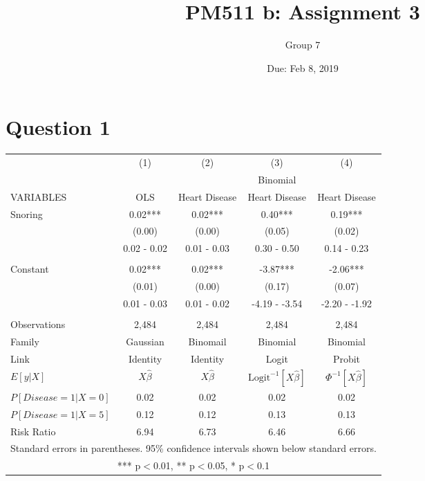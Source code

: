 \documentclass{article}
\title{PM511 b: Assignment 3}
\author{Group 7}
\date{Due: Feb 8, 2019}
\begin{document}
\selectfont

\maketitle

\section*{Question 1}

\begin{table}[!h]
\centering
\begin{tabular}{lcccc} \toprule
 & (1) & (2) & (3) & (4) \\
 &&\multicolumn{3}{c}{Binomial} \\ \cmidrule(r){3-5} 
VARIABLES & OLS & Heart Disease & Heart Disease & Heart Disease \\ \midrule
Snoring & 0.02*** & 0.02*** & 0.40*** & 0.19*** \\
 & (0.00) & (0.00) & (0.05) & (0.02) \\
 & 0.02 - 0.02 & 0.01 - 0.03 & 0.30 - 0.50 & 0.14 - 0.23 \\ \\
Constant & 0.02*** & 0.02*** & -3.87*** & -2.06*** \\
 & (0.01) & (0.00) & (0.17) & (0.07) \\
 & 0.01 - 0.03 & 0.01 - 0.02 & -4.19 - -3.54 & -2.20 - -1.92 \\
 &  &  &  &  \\
Observations & 2,484 & 2,484 & 2,484 & 2,484 \\
Family & Gaussian & Binomail & Binomial & Binomial \\
Link & Identity & Identity & Logit & Probit \\
$ E[y|X] $ & $ X\hat\beta $ & $ X\hat\beta $ & $\mbox{Logit}^{-1}[X\hat\beta] $ & $\Phi^{-1}[X\hat\beta] $ \\
$ P[Disease=1|X=0] $ & 0.02 & 0.02 & 0.02 & 0.02 \\
$ P[Disease=1|X=5] $ & 0.12 & 0.12 & 0.13 & 0.13 \\
 Risk Ratio & 6.94 & 6.73 & 6.46 & 6.66 \\ \bottomrule
\multicolumn{5}{c}{ Standard errors in parentheses. 95\% confidence intervals shown below standard errors.} \\
\multicolumn{5}{c}{ *** p$<$0.01, ** p$<$0.05, * p$<$0.1} \\
\end{tabular}
\end{table}
\end{document}
